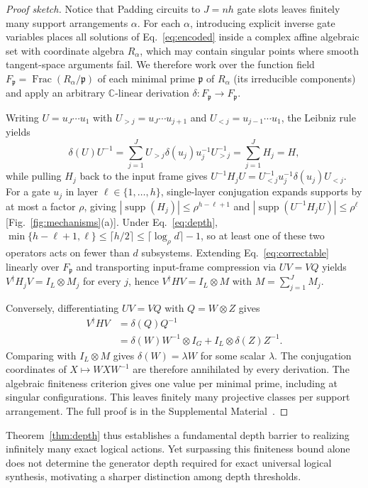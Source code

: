 \documentclass[aps,prl,reprint,notitlepage,nofootinbib,nobibnotes]{revtex4-2}
\newcommand{\id}{I}
\newcommand{\supp}{\operatorname{supp}}
\begin{document}
\begin{proof}[Proof sketch]
Notice that Padding circuits to $J=nh$ gate slots
leaves finitely many support arrangements $\alpha$. For each $\alpha$, introducing explicit inverse
gate variables places all solutions of Eq.~\eqref{eq:encoded} inside a complex affine algebraic set
with coordinate algebra $R_\alpha$, which may contain singular points where smooth tangent-space
arguments fail. We therefore work over the function field $F_{\mathfrak
p}=\operatorname{Frac}(R_\alpha/\mathfrak p)$ of each minimal prime $\mathfrak p$ of $R_\alpha$
(its irreducible components) and apply an arbitrary $\mathbb C$-linear derivation
$\delta:F_{\mathfrak p}\to F_{\mathfrak p}$.

Writing $U=u_J\cdots u_1$ with $U_{>j}=u_J\cdots u_{j+1}$ and $U_{<j}=u_{j-1}\cdots u_1$, the
Leibniz rule yields
\begin{equation}\label{eq:sketch-generator}
 \delta(U)U^{-1}
  =\sum_{j=1}^J U_{>j}\delta(u_j)u_j^{-1}U_{>j}^{-1}
  =\sum_{j=1}^J H_j=H,
\end{equation}
while pulling $H_j$ back to the input frame gives
$U^{-1}H_jU=U_{<j}^{-1}u_j^{-1}\delta(u_j)U_{<j}$. For a gate $u_j$ in layer
$\ell\in\{1,\ldots,h\}$, single-layer conjugation expands supports by at most a factor $\rho$,
giving $|\supp(H_j)|\le\rho^{h-\ell+1}$ and $|\supp(U^{-1}H_jU)|\le\rho^\ell$
[Fig.~\ref{fig:mechanisms}(a)]. Under Eq.~\eqref{eq:depth}, $\min\{h-\ell+1,\ell\}\le\lceil
h/2\rceil\le\lceil\log_\rho d\rceil-1$, so at least one of these two operators acts on fewer than
$d$ subsystems. Extending Eq.~\eqref{eq:correctable} linearly over $F_{\mathfrak p}$ and
transporting input-frame compression via $UV=VQ$ yields $V^\dagger H_jV=\id_L\otimes M_j$ for every
$j$, hence $V^\dagger HV=\id_L\otimes M$ with $M=\sum_{j=1}^J M_j$.

Conversely, differentiating $UV=VQ$ with $Q=W\otimes Z$ gives
\begin{align*}
 V^\dagger HV &= \delta(Q)Q^{-1} \\
  &= \delta(W)W^{-1}\otimes\id_G+\id_L\otimes\delta(Z)Z^{-1}.
\end{align*}
Comparing with $\id_L\otimes M$ gives $\delta(W)=\lambda W$ for some scalar $\lambda$. The
conjugation coordinates of $X\mapsto WXW^{-1}$ are therefore annihilated by every derivation. The
algebraic finiteness criterion gives one value per minimal prime, including at singular
configurations. This leaves finitely many projective classes per support arrangement. The full
proof is in the Supplemental Material~\cite{Supplement}.
\end{proof}
 Theorem~\ref{thm:depth} thus establishes a fundamental depth barrier to realizing infinitely many exact logical actions. Yet surpassing this finiteness bound alone does not determine the generator depth required for exact universal logical synthesis, motivating a sharper distinction among depth thresholds.
\end{document}

